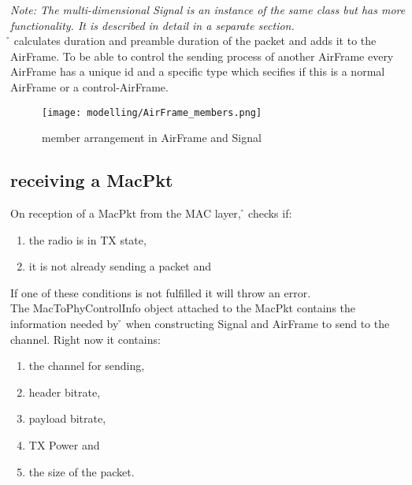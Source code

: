 \emph{Note: The multi-dimensional Signal is an instance of the same class but has more functionality. It is described in detail in a separate section.}\\

\h{\bp} calculates duration and preamble duration of the packet and adds it to the AirFrame. 
To be able to control the sending process of another AirFrame every AirFrame has a unique id and a specific type which secifies if this is a normal AirFrame or a control-AirFrame.


\begin{figure}[H]
 \centering
 \texttt{[image: modelling/AirFrame\_members.png]}
 \caption{member arrangement in AirFrame and Signal}
 \label{fig: member AirFrame}
\end{figure}



\subsection{receiving a MacPkt}

On reception of a MacPkt from the MAC layer, \h{\bp} checks if:
\begin{enumerate}
	\item the radio is in TX state,
	\item it is not already sending a packet and
\end{enumerate} 

If one of these conditions is not fulfilled it will throw an error.\\

The MacToPhyControlInfo object attached to the MacPkt contains the information needed by \h{\bp} when constructing Signal and AirFrame to send to the channel. Right now it contains:

\begin{enumerate}
	\item the channel for sending,
	\item header bitrate,
	\item payload bitrate,
	\item TX Power and
	\item the size of the packet.

\end{enumerate}


